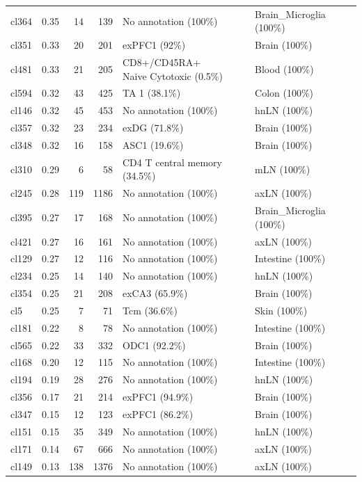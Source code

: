 \begin{table}[ht!]
\begin{tabular}{lrrrll}
  cl364 & 0.35 &  14 & 139 & No annotation (100\%) & Brain\_Microglia (100\%) \\ 
  cl351 & 0.33 &  20 & 201 & exPFC1 (92\%) & Brain (100\%) \\ 
  cl481 & 0.33 &  21 & 205 & \specialcell[t]{CD8+/CD45RA+\\Naive Cytotoxic (0.5\%)} & Blood (100\%) \\ 
  cl594 & 0.32 &  43 & 425 & TA 1 (38.1\%) & Colon (100\%) \\ 
  cl146 & 0.32 &  45 & 453 & No annotation (100\%) & hnLN (100\%) \\ 
  cl357 & 0.32 &  23 & 234 & exDG (71.8\%) & Brain (100\%) \\ 
  cl348 & 0.32 &  16 & 158 & ASC1 (19.6\%) & Brain (100\%) \\ 
  cl310 & 0.29 &   6 &  58 & CD4 T central memory (34.5\%) & mLN (100\%) \\ 
  cl245 & 0.28 & 119 & 1186 & No annotation (100\%) & axLN (100\%) \\ 
  cl395 & 0.27 &  17 & 168 & No annotation (100\%) & Brain\_Microglia (100\%) \\ 
  cl421 & 0.27 &  16 & 161 & No annotation (100\%) & axLN (100\%) \\ 
  cl129 & 0.27 &  12 & 116 & No annotation (100\%) & Intestine (100\%) \\ 
  cl234 & 0.25 &  14 & 140 & No annotation (100\%) & hnLN (100\%) \\ 
  cl354 & 0.25 &  21 & 208 & exCA3 (65.9\%) & Brain (100\%) \\ 
  cl5 & 0.25 &   7 &  71 & Tcm (36.6\%) & Skin (100\%) \\ 
  cl181 & 0.22 &   8 &  78 & No annotation (100\%) & Intestine (100\%) \\ 
  cl565 & 0.22 &  33 & 332 & ODC1 (92.2\%) & Brain (100\%) \\ 
  cl168 & 0.20 &  12 & 115 & No annotation (100\%) & Intestine (100\%) \\ 
  cl194 & 0.19 &  28 & 276 & No annotation (100\%) & hnLN (100\%) \\ 
  cl356 & 0.17 &  21 & 214 & exPFC1 (94.9\%) & Brain (100\%) \\ 
  cl347 & 0.15 &  12 & 123 & exPFC1 (86.2\%) & Brain (100\%) \\ 
  cl151 & 0.15 &  35 & 349 & No annotation (100\%) & hnLN (100\%) \\ 
  cl171 & 0.14 &  67 & 666 & No annotation (100\%) & axLN (100\%) \\ 
  cl149 & 0.13 & 138 & 1376 & No annotation (100\%) & axLN (100\%) \\ 

\end{tabular}
\end{table}
